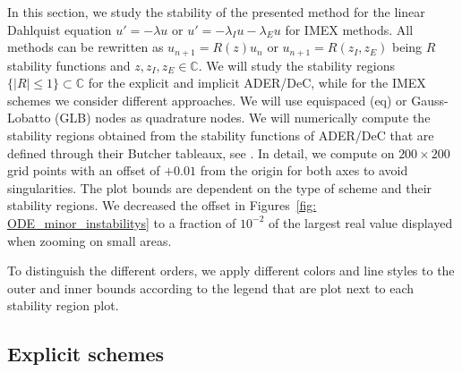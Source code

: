 In this section, we study the stability of the presented method for the linear Dahlquist equation $u' = -\lambda u$ or $u' = -\lambda_I u - \lambda_E u$ for IMEX methods. All methods can be rewritten as $u_{n+1} = R(z)u_n$ or $u_{n+1}= R(z_I,z_E)$ being $R$ stability functions and $z,z_I,z_E\in \mathbb C$. 
We will study the stability regions $\lbrace |R|\leq 1\rbrace \subset \mathbb C$ for the explicit and implicit ADER/DeC, while for the IMEX schemes we consider different approaches. 
We will use equispaced (eq) or Gauss-Lobatto (GLB) nodes as quadrature nodes.
We will numerically compute the stability regions obtained from the stability functions of ADER/DeC that are defined through their Butcher tableaux, see \cite{hairer1987solving}.
In detail, we compute on $200\times 200$ grid points with an offset of $+0.01$ from the origin for both axes to avoid singularities. 
The plot bounds are dependent on the type of scheme and their stability regions.
We decreased the offset in Figures~\ref{fig: ODE_minor_instabilitys} to a fraction of $10^{-2}$ of the largest real value displayed when zooming on small areas.

To distinguish the different orders, we apply different colors and line styles to the outer and inner bounds according to the legend that are plot next to each stability region plot.
\subsection{Explicit schemes}

